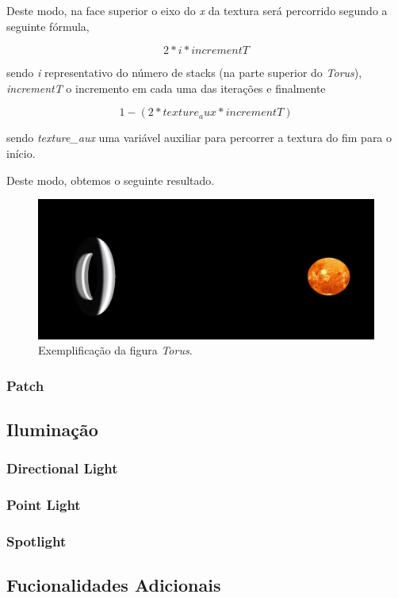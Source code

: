 \documentclass[a4paper]{article}
\begin{document}
Deste modo, na face superior o eixo do \textit{x} da textura será percorrido segundo a seguinte fórmula,

\[ 2 * i * incrementT \]

sendo \textit{i} representativo do número de stacks (na parte superior do \textit{Torus}), \textit{incrementT} o incremento em cada uma das iterações e finalmente

\[ 1 - (2 * texture_aux * incrementT) \]

sendo \textit{texture\_aux} uma variável auxiliar para percorrer a textura do fim para o início.

Deste modo, obtemos o seguinte resultado.

\begin{figure}[!h]
    \centering
    \includegraphics[width=0.5\linewidth]{exemplo_torus.png}
    \caption{Exemplificação da figura \textit{Torus}.}
    \label{fig:ref_ex_torus}
\end{figure}

\subsubsection{Patch}


\subsection{Iluminação} %

\subsubsection{Directional Light}
\subsubsection{Point Light}
\subsubsection{Spotlight}

\subsection{Fucionalidades Adicionais}
\end{document}
